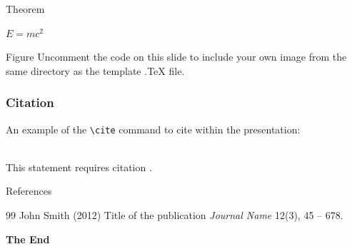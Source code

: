 \documentclass[aspectratio=169,xcolor=dvipsnames]{beamer}
\begin{document}
\begin{frame}{Theorem}
    \begin{theorem}
        $E = mc^2$
    \end{theorem}
\end{frame}


\begin{frame}{Figure}
    Uncomment the code on this slide to include your own image from the same directory as the template .TeX file.
\end{frame}


\begin{frame}[fragile] %
    \frametitle{Citation}
    An example of the \verb|\cite| command to cite within the presentation:\\~

    This statement requires citation \cite{p1}.
\end{frame}


\begin{frame}{References}
    \footnotesize{
        \begin{thebibliography}{99}
             John Smith (2012)
            \newblock Title of the publication
            \newblock \emph{Journal Name} 12(3), 45 -- 678.
        \end{thebibliography}
    }
\end{frame}


\begin{frame}
    \Huge{\centerline{\textbf{The End}}}
\end{frame}

\end{document}

